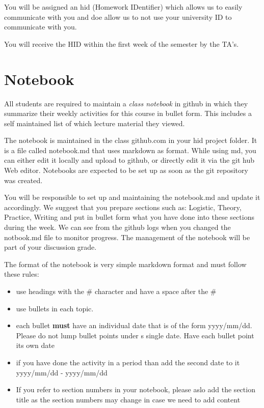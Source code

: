 You will be assigned an hid (Homework IDentifier) which allows us to
easily communicate with you and doe allow us to not use your
university ID to communicate with you. 

You will receive the HID within the first week of the semester by the
TA's.

\section{Notebook}\label{notebook}

All students are required to maintain a \emph{class notebook} in
github in which they summarize their weekly activities for this course
in bullet form. This includes a self maintained list of which lecture
material they viewed.

The notebook is maintained in the class github.com in your hid project
folder. It is a file called notebook.md that uses markdown as format.
While using md, you can either edit it locally and upload to github, or
directly edit it via the git hub Web editor. Notebooks are expected to
be set up as soon as the git repository was created.

You will be responsible to set up and maintaining the notebook.md and
update it accordingly. We suggest that you prepare sections such as:
Logistic, Theory, Practice, Writing and put in bullet form what you have
done into these sections during the week. We can see from the github
logs when you changed the notbook.md file to monitor progress. The
management of the notebook will be part of your discussion grade.

The format of the notebook is very simple markdown format and must
follow these rules:

\begin{itemize}
\item use headings with the \# character and have a space after the \#
\item use bullets in each topic.
\item each bullet \textbf{must} have an individual date that is of the
  form yyyy/mm/dd. Please do not lump bullet points under s single
  date. Have each bullet point its own date
\item if you have done the activity in a period than add the second
  date to it yyyy/mm/dd - yyyy/mm/dd
\item If you refer to section numbers in your notebook, please aslo
  add the section title as the section numbers may change in case we
  need to add content
\end{itemize}

